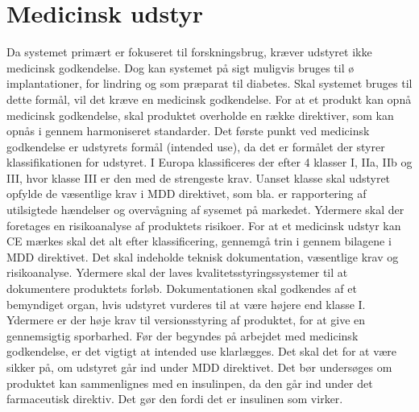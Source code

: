 \section{Medicinsk udstyr}
 Da systemet primært er fokuseret til forskningsbrug, kræver udstyret ikke medicinsk godkendelse. Dog kan systemet på sigt muligvis bruges til ø implantationer, for lindring og som præparat til diabetes. Skal systemet bruges til dette formål, vil det kræve en medicinsk godkendelse. For at et produkt kan opnå medicinsk godkendelse, skal produktet overholde en række direktiver, som kan opnås i gennem harmoniseret standarder. Det første punkt ved medicinsk godkendelse er udstyrets formål (intended use), da det er formålet der styrer klassifikationen for udstyret. I Europa klassificeres der efter 4 klasser I, IIa, IIb og III, hvor klasse III er den med de strengeste krav. Uanset klasse skal udstyret opfylde de væsentlige krav i MDD direktivet, som bla. er rapportering af utilsigtede hændelser og overvågning af sysemet på markedet. Ydermere skal der foretages en risikoanalyse af produktets risikoer. For at et medicinsk udstyr kan CE mærkes skal det alt efter klassificering, gennemgå trin i gennem bilagene i MDD direktivet. Det skal indeholde teknisk dokumentation, væsentlige krav og risikoanalyse. Ydermere skal der laves kvalitetsstyringssystemer til at dokumentere produktets forløb. Dokumentationen skal godkendes af et bemyndiget organ, hvis udstyret vurderes til at være højere end klasse I. Ydermere er der høje krav til versionsstyring af produktet, for at give en gennemsigtig sporbarhed. Før der begyndes på arbejdet med medicinsk godkendelse, er det vigtigt at intended use klarlægges. Det skal det for at være sikker på, om udstyret går ind under MDD direktivet. Det bør undersøges om produktet kan sammenlignes med en insulinpen, da den går ind under det farmaceutisk direktiv. Det gør den fordi det er insulinen som virker. 